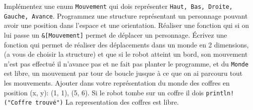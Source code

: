 \documentclass[11pt,a4paper,addpoint]{exam}
\begin{document}
\begin{questions}
\question[1] Implémentez une enum \texttt{Mouvement} qui dois représenter \texttt{Haut, Bas, Droite, Gauche, Avance}.
\question[1] Programmez une structure représentant un personnage pouvant avoir une position dans l'espace et une orientation.
\question[1] Réaliser une fonction qui si on lui passe un \texttt{\&[Mouvement]} permet de déplacer un personnage.
\question[1] Écrivez une fonction qui permet de réaliser des déplacements dans un monde en 2 dimensions, (a vous de choisir la structure) et que si le robot atteint un bord,
son mouvement n'est pas effectué il n'avance pas et ne fait pas planter le programme, et du \texttt{Monde} est libre, un mouvement par tour de boucle jusque à ce que on ai parcouru tout les mouvements.
\question[1] Ajouter dans votre représentation du monde des coffres en position (x, y): (1, 1), (5, 6). Si le robot tombe sur un coffre il dois \texttt{println!("Coffre trouvé")}
La representation des coffres est libre.
\end{questions}
\end{document}
